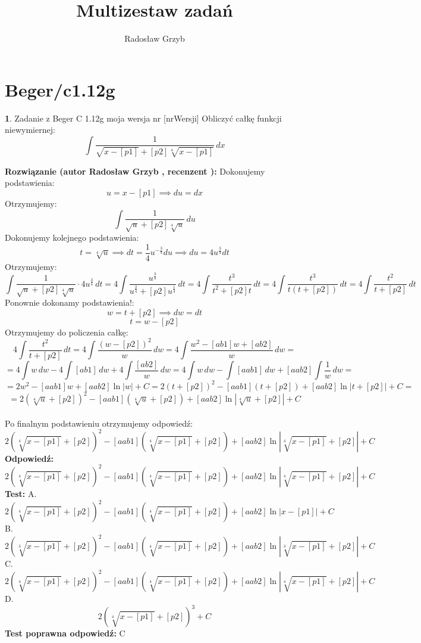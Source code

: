 \documentclass[12pt, a4paper]{article}
\title{Multizestaw zadań}
\author{Radosław Grzyb}
\date{}
\theoremstyle{definition} %
\newtheorem{zad}{}
\newcommand{\kategoria}[1]{\section{#1}} %
\newcommand{\zadStart}[1]{\begin{zad}#1\newline} %
\newcommand{\zadStop}{\end{zad}}   %
\newcommand{\rozwStart}[2]{\noindent \textbf{Rozwiązanie (autor #1 , recenzent #2): }\newline} %
\newcommand{\rozwStop}{\newline}                                            %
\newcommand{\odpStart}{\noindent \textbf{Odpowiedź:}\newline}    %
\newcommand{\odpStop}{\newline}                                             %
\newcommand{\testStart}{\noindent \textbf{Test:}\newline} %
\newcommand{\testStop}{\newline} %
\newcommand{\kluczStart}{\noindent \textbf{Test poprawna odpowiedź:}\newline} %
\newcommand{\kluczStop}{\newline} %
\begin{document}
\maketitle
\kategoria{Beger/c1.12g}
\zadStart{Zadanie z Beger C 1.12g moja wersja nr [nrWersji]}
Obliczyć całkę funkcji niewymiernej:
$$\int \frac{1}{\sqrt{x-[p1]}+[p2]\sqrt[4]{x-[p1]}}\,dx$$
\zadStop
\rozwStart{Radosław Grzyb}{}
Dokonujemy podstawienia:
$$u=x-[p1]\implies du=dx$$
Otrzymujemy:
$$\int \frac{1}{\sqrt{u}+[p2]\sqrt[4]{u}}\,du$$
Dokonujemy kolejnego podstawienia:
$$t=\sqrt[4]{u} \implies dt=\frac{1}{4}u^{-\frac{3}{4}} du\implies du=4u^{\frac{3}{4}}dt$$
Otrzymujemy: 
$$\int \frac{1}{\sqrt{u}+[p2]\sqrt[4]{u}}\cdot4u^{\frac{3}{4}}\,dt=4\int \frac{u^{\frac{3}{4}}}{u^{\frac{2}{4}}+[p2]u^{\frac{1}{4}}}\,dt=4\int\frac{t^3}{t^2+[p2]t}\,dt=4\int\frac{t^3}{t(t+[p2])}\,dt=4\int\frac{t^2}{t+[p2]}\,dt$$
Ponownie dokonamy podstawienia!:
$$w=t+[p2] \implies dw=dt$$
$$t=w-[p2]$$
Otrzymujemy do policzenia całkę:
$$4\int\frac{t^2}{t+[p2]}\,dt=4\int\frac{(w-[p2])^2}{w}\,dw=4\int\frac{w^2-[ab1]w+[ab2]}{w}\,dw=$$
$$=4\int w\,dw-4\int [ab1]\,dw +4\int\frac{[ab2]}{w}\,dw=4\int w\,dw-\int [aab1]\,dw +[aab2]\int\frac{1}{w}\,dw=$$
$$=2w^{2}-[aab1]w+[aab2]\ln|w|+C=2(t+[p2])^{2}-[aab1](t+[p2])+[aab2]\ln|t+[p2]|+C=$$
$$=2(\sqrt[4]{u}+[p2])^{2}-[aab1](\sqrt[4]{u}+[p2])+[aab2]\ln|\sqrt[4]{u}+[p2]|+C$$\\
Po finalnym podstawieniu otrzymujemy odpowiedź:
$$2(\sqrt[4]{x-[p1]}+[p2])^{2}-[aab1](\sqrt[4]{x-[p1]}+[p2])+[aab2]\ln|\sqrt[4]{x-[p1]}+[p2]|+C$$
\rozwStop
\odpStart
$$2(\sqrt[4]{x-[p1]}+[p2])^{2}-[aab1](\sqrt[4]{x-[p1]}+[p2])+[aab2]\ln|\sqrt[4]{x-[p1]}+[p2]|+C$$
\odpStop
\testStart
A.$$2(\sqrt[4]{x-[p1]}+[p2])^{2}-[aab1](\sqrt[4]{x-[p1]}+[p2])+[aab2]\ln|x-[p1]|+C$$
B.$$2(\sqrt[3]{x-[p1]}+[p2])^{2}-[aab1](\sqrt[4]{x-[p1]}+[p2])+[aab2]\ln|\sqrt[3]{x-[p1]}+[p2]|+C$$
C.$$2(\sqrt[4]{x-[p1]}+[p2])^{2}-[aab1](\sqrt[4]{x-[p1]}+[p2])+[aab2]\ln|\sqrt[4]{x-[p1]}+[p2]|+C$$
D.$$2(\sqrt[4]{x-[p1]}+[p2])^{3}+C$$
\testStop
\kluczStart
C
\kluczStop
\end{document}
